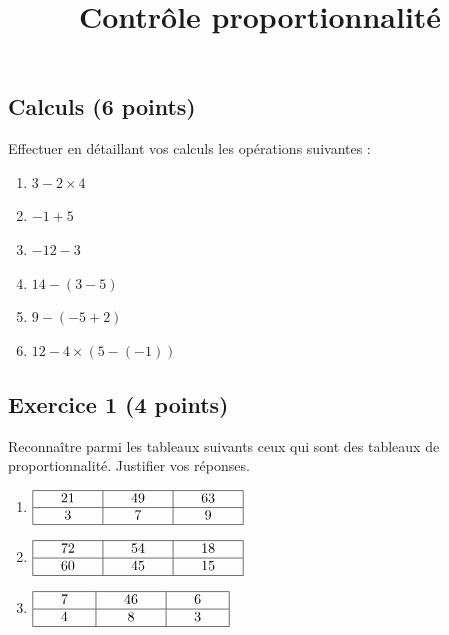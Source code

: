 \documentclass[14 pt]{extarticle}
\title{Contrôle proportionnalité}
\date{}
\theoremstyle{plain}
\begin{document}
 
 \subsection*{Calculs (6 points)}
 Effectuer en détaillant vos calculs les opérations suivantes : 
 \begin{enumerate}
 \item $3 - 2 \times 4$
 \item $-1 + 5$
 \item $ - 12 -3$
 \item $14- (3-5)$
 \item $9 - ( - 5 +2)$
 \item $12 - 4 \times (5 - (-1))$
 \end{enumerate}
 \subsection*{Exercice 1 (4 points)}

 Reconnaître parmi les tableaux suivants ceux qui sont des tableaux de proportionnalité. Justifier vos réponses.
 \begin{enumerate}
 \item $\renewcommand{\arraystretch}{1}
\begin{array}{|c|c|c|}
\hline
\phantom{000}21\phantom{000} & \phantom{000}49\phantom{000} & \phantom{000}63\phantom{000}\\
\hline
3 & 7 & 9\\
\hline
\end{array}
\renewcommand{\arraystretch}{1}$

\item $\renewcommand{\arraystretch}{1}
\begin{array}{|c|c|c|}
\hline
\phantom{000}72\phantom{000} & \phantom{000}54\phantom{000} & \phantom{000}18\phantom{000}\\
\hline
60 & 45  & 15\\
\hline
\end{array}
\renewcommand{\arraystretch}{1}$

 \item $\renewcommand{\arraystretch}{1}
\begin{array}{|c|c|c|}
\hline
\phantom{000}7\phantom{000} & \phantom{000}46 \phantom{000} & \phantom{000}6\phantom{000}\\
\hline
4 & 8 & 3\\
\hline
\end{array}
\renewcommand{\arraystretch}{1}$



\end{enumerate}
\end{document}
